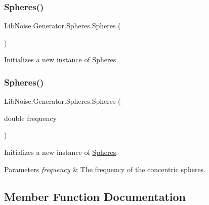 \subsubsection{\texorpdfstring{Spheres()}{Spheres()}\hspace{0.1cm}{\footnotesize\ttfamily [1/2]}}
{\footnotesize\ttfamily Lib\+Noise.\+Generator.\+Spheres.\+Spheres (\begin{DoxyParamCaption}{ }\end{DoxyParamCaption})}



Initializes a new instance of \hyperlink{class_lib_noise_1_1_generator_1_1_spheres}{Spheres}. 

\mbox{\label{class_lib_noise_1_1_generator_1_1_spheres_a78e8f18da6553721c79eb6666959d958}} 
\subsubsection{\texorpdfstring{Spheres()}{Spheres()}\hspace{0.1cm}{\footnotesize\ttfamily [2/2]}}
{\footnotesize\ttfamily Lib\+Noise.\+Generator.\+Spheres.\+Spheres (\begin{DoxyParamCaption}\item[{double}]{frequency }\end{DoxyParamCaption})}



Initializes a new instance of \hyperlink{class_lib_noise_1_1_generator_1_1_spheres}{Spheres}. 


\begin{DoxyParams}{Parameters}
{\em frequency} & The frequency of the concentric spheres.\\
\hline
\end{DoxyParams}


\subsection{Member Function Documentation}
\mbox{\label{class_lib_noise_1_1_generator_1_1_spheres_a320ec44c2f92dd08dcb573e6cc291dc6}} 
